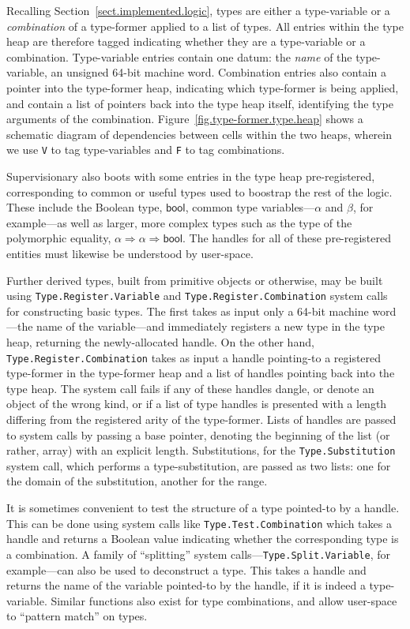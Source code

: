 \documentclass[a4paper, UKenglish, cleveref, autoref, thm-restate, colorlinks]{lipics-v2021}
\begin{document}
Recalling Section~\ref{sect.implemented.logic}, types are either a type-variable or a \emph{combination} of a type-former applied to a list of types.
All entries within the type heap are therefore tagged indicating whether they are a type-variable or a combination.
Type-variable entries contain one datum: the \emph{name} of the type-variable, an unsigned 64-bit machine word.
Combination entries also contain a pointer into the type-former heap, indicating which type-former is being applied, and contain a list of pointers back into the type heap itself, identifying the type arguments of the combination.
Figure~\ref{fig.type-former.type.heap} shows a schematic diagram of dependencies between cells within the two heaps, wherein we use \texttt{V} to tag type-variables and \texttt{F} to tag combinations.

Supervisionary also boots with some entries in the type heap pre-registered, corresponding to common or useful types used to boostrap the rest of the logic.
These include the Boolean type, $\mathsf{bool}$, common type variables---$\alpha$ and $\beta$, for example---as well as larger, more complex types such as the type of the polymorphic equality, $\alpha \Rightarrow \alpha \Rightarrow \mathsf{bool}$.
The handles for all of these pre-registered entities must likewise be understood by user-space.

Further derived types, built from primitive objects or otherwise, may be built using \texttt{Type.Register.Variable} and \texttt{Type.Register.Combination} system calls for constructing basic types.
The first takes as input only a 64-bit machine word---the name of the variable---and immediately registers a new type in the type heap, returning the newly-allocated handle.
On the other hand, \texttt{Type.Register.Combination} takes as input a handle pointing-to a registered type-former in the type-former heap and a list of handles pointing back into the type heap.
The system call fails if any of these handles dangle, or denote an object of the wrong kind, or if a list of type handles is presented with a length differing from the registered arity of the type-former.
Lists of handles are passed to system calls by passing a base pointer, denoting the beginning of the list (or rather, array) with an explicit length.
Substitutions, for the \texttt{Type.Substitution} system call, which performs a type-substitution, are passed as two lists: one for the domain of the substitution, another for the range.

It is sometimes convenient to test the structure of a type pointed-to by a handle.
This can be done using system calls like \texttt{Type.Test.Combination} which takes a handle and returns a Boolean value indicating whether the corresponding type is a combination.
A family of ``splitting'' system calls---\texttt{Type.Split.Variable}, for example---can also be used to deconstruct a type.
This takes a handle and returns the name of the variable pointed-to by the handle, if it is indeed a type-variable.
Similar functions also exist for type combinations, and allow user-space to ``pattern match'' on types.
\end{document}
